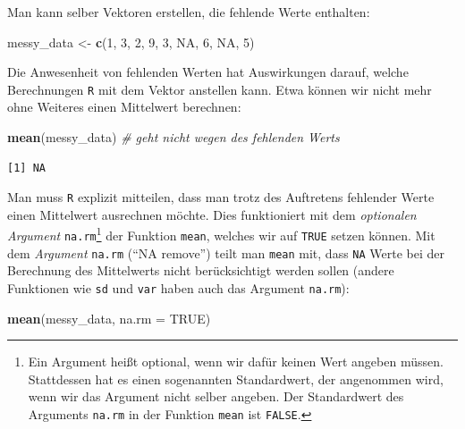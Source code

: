 \documentclass[12pt,]{tufte-book}
\newenvironment{Shaded}{\begin{snugshade}}{\end{snugshade}}
\newcommand{\KeywordTok}[1]{\textcolor[rgb]{0.13,0.29,0.53}{\textbf{#1}}}
\newcommand{\DataTypeTok}[1]{\textcolor[rgb]{0.13,0.29,0.53}{#1}}
\newcommand{\DecValTok}[1]{\textcolor[rgb]{0.00,0.00,0.81}{#1}}
\newcommand{\StringTok}[1]{\textcolor[rgb]{0.31,0.60,0.02}{#1}}
\newcommand{\CommentTok}[1]{\textcolor[rgb]{0.56,0.35,0.01}{\textit{#1}}}
\newcommand{\OtherTok}[1]{\textcolor[rgb]{0.56,0.35,0.01}{#1}}
\newcommand{\NormalTok}[1]{#1}
\theoremstyle{definition}
\theoremstyle{definition}
\theoremstyle{definition}
\theoremstyle{remark}
\begin{document}
Man kann selber Vektoren erstellen, die fehlende Werte enthalten:

\begin{Shaded}
\begin{Highlighting}[]
\NormalTok{messy_data <-}\StringTok{ }\KeywordTok{c}\NormalTok{(}\DecValTok{1}\NormalTok{, }\DecValTok{3}\NormalTok{, }\DecValTok{2}\NormalTok{, }\DecValTok{9}\NormalTok{, }\DecValTok{3}\NormalTok{, }\OtherTok{NA}\NormalTok{, }\DecValTok{6}\NormalTok{, }\OtherTok{NA}\NormalTok{, }\DecValTok{5}\NormalTok{)}
\end{Highlighting}
\end{Shaded}

Die Anwesenheit von fehlenden Werten hat Auswirkungen darauf, welche
Berechnungen \texttt{R} mit dem Vektor anstellen kann. Etwa können wir
nicht mehr ohne Weiteres einen Mittelwert berechnen:

\begin{Shaded}
\begin{Highlighting}[]
\KeywordTok{mean}\NormalTok{(messy_data)  }\CommentTok{# geht nicht wegen des fehlenden Werts}
\end{Highlighting}
\end{Shaded}

\begin{verbatim}
[1] NA
\end{verbatim}

Man muss \texttt{R} explizit mitteilen, dass man trotz des Auftretens
fehlender Werte einen Mittelwert ausrechnen möchte. Dies funktioniert
mit dem \emph{optionalen Argument} \texttt{na.rm}\footnote{Ein Argument
  heißt optional, wenn wir dafür keinen Wert angeben müssen. Stattdessen
  hat es einen sogenannten Standardwert, der angenommen wird, wenn wir
  das Argument nicht selber angeben. Der Standardwert des Arguments
  \texttt{na.rm} in der Funktion \texttt{mean} ist \texttt{FALSE}.} der
Funktion \texttt{mean}, welches wir auf \texttt{TRUE} setzen können. Mit
dem \emph{Argument} \texttt{na.rm} (``NA remove'') teilt man
\texttt{mean} mit, dass \texttt{NA} Werte bei der Berechnung des
Mittelwerts nicht berücksichtigt werden sollen (andere Funktionen wie
\texttt{sd} und \texttt{var} haben auch das Argument \texttt{na.rm}):

\begin{Shaded}
\begin{Highlighting}[]
\KeywordTok{mean}\NormalTok{(messy_data, }\DataTypeTok{na.rm =} \OtherTok{TRUE}\NormalTok{)}
\end{Highlighting}
\end{Shaded}
\end{document}
